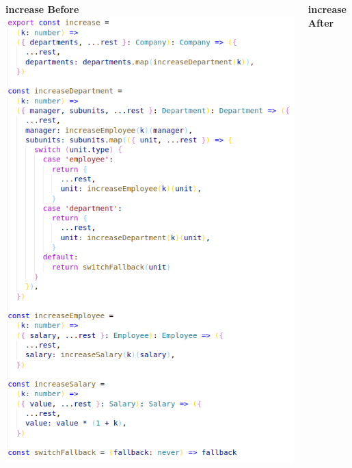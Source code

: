 \documentclass[14pt]{beamer}
\begin{document}
\begin{frame}
  \begin{columns}
    \begin{column}{.5\textwidth}
      \vspace{1em}
      \centering\textbf{increase Before}
      \includegraphics[height=0.7\textheight,width=\textwidth,keepaspectratio]{graphics/increase-naive-ts.png}
    \end{column}
    \begin{column}{.5\textwidth}
      \vspace{1em}
      \centering\textbf{increase After}

\end{column}
\end{columns}
\end{frame}
\end{document}
